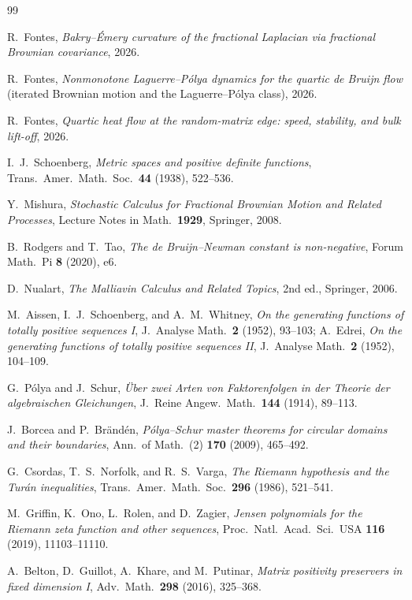 \documentclass[11pt,reqno]{amsart}
\theoremstyle{plain}
\theoremstyle{definition}
\theoremstyle{remark}
\begin{document}
\begin{thebibliography}{99}

 R.~Fontes, \emph{Bakry--\'Emery curvature of the
fractional Laplacian via fractional Brownian covariance}, 2026.

 R.~Fontes, \emph{Nonmonotone Laguerre--P\'olya
dynamics for the quartic de Bruijn flow} (iterated Brownian motion and
the Laguerre--P\'olya class), 2026.

 R.~Fontes, \emph{Quartic heat flow at the
random-matrix edge: speed, stability, and bulk lift-off}, 2026.

 I.~J.~Schoenberg, \emph{Metric spaces and positive
definite functions}, Trans.\ Amer.\ Math.\ Soc.\ \textbf{44} (1938),
522--536.

 Y.~Mishura, \emph{Stochastic Calculus for Fractional
Brownian Motion and Related Processes}, Lecture Notes in Math.\
\textbf{1929}, Springer, 2008.

 B.~Rodgers and T.~Tao, \emph{The de Bruijn--Newman
constant is non-negative}, Forum Math.\ Pi \textbf{8} (2020), e6.

 D.~Nualart, \emph{The Malliavin Calculus and Related
Topics}, 2nd ed., Springer, 2006.

 M.~Aissen, I.~J.~Schoenberg, and A.~M.~Whitney, \emph{On the
generating functions of totally positive sequences I}, J.\ Analyse Math.\
\textbf{2} (1952), 93--103; A.~Edrei, \emph{On the generating functions of
totally positive sequences II}, J.\ Analyse Math.\ \textbf{2} (1952),
104--109.

 G.~P\'olya and J.~Schur, \emph{\"Uber zwei Arten von
Faktorenfolgen in der Theorie der algebraischen Gleichungen}, J.\ Reine
Angew.\ Math.\ \textbf{144} (1914), 89--113.

 J.~Borcea and P.~Br\"and\'en, \emph{P\'olya--Schur
master theorems for circular domains and their boundaries}, Ann.\ of
Math.\ (2) \textbf{170} (2009), 465--492.

 G.~Csordas, T.~S.~Norfolk, and R.~S.~Varga,
\emph{The Riemann hypothesis and the Tur\'an inequalities}, Trans.\ Amer.\
Math.\ Soc.\ \textbf{296} (1986), 521--541.

\bibitem{GORZ} M.~Griffin, K.~Ono, L.~Rolen, and D.~Zagier,
\emph{Jensen polynomials for the Riemann zeta function and other
sequences}, Proc.\ Natl.\ Acad.\ Sci.\ USA \textbf{116} (2019),
11103--11110.

\bibitem{BGKP} A.~Belton, D.~Guillot, A.~Khare, and M.~Putinar,
\emph{Matrix positivity preservers in fixed dimension I}, Adv.\ Math.\
\textbf{298} (2016), 325--368.

\end{thebibliography}
\end{document}

